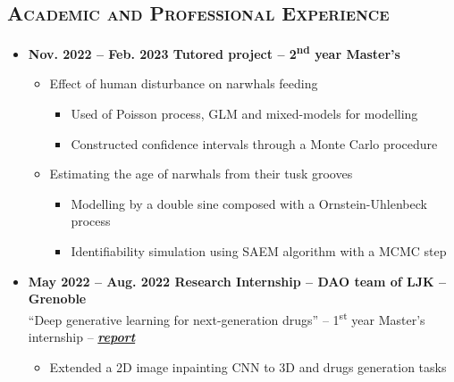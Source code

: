 \documentclass{article}
\begin{document}
\begin{minipage}{0.8\textwidth}
\begin{flushleft}
    \section*{\textsc{Academic and Professional Experience}}
    \begin{itemize}
        \item \textbf{Nov. 2022 – Feb. 2023 \qquad Tutored project – 2\textsuperscript{nd} year Master’s}
        \vspace{-.15cm}
        \begin{itemize}[leftmargin=*]
        \setlength\itemsep{.01cm}
            \item Effect of human disturbance on narwhals feeding
            \vspace{-.15cm}
            \begin{itemize}[leftmargin=*]
            \setlength\itemsep{.01cm}
                \item Used of Poisson process, GLM and mixed-models for modelling
                \item Constructed confidence intervals through a Monte Carlo procedure
            \end{itemize}
            \item Estimating the age of narwhals from their tusk grooves
            \vspace{-.15cm}
            \begin{itemize}[leftmargin=*]
            \setlength\itemsep{.01cm}
                \item Modelling by a double sine composed with a Ornstein-Uhlenbeck process
                \item Identifiability simulation using SAEM algorithm with a MCMC step
            \end{itemize}
        \end{itemize}
        \item \textbf{May 2022 – Aug. 2022 \qquad Research Internship – DAO team of LJK – Grenoble} \\
        “Deep generative learning for next-generation drugs” – 1\textsuperscript{st} year Master’s internship – \textbf{\textit{ \hyperlink{https://vadmbertr.github.io/Deep-generative-learning-for-next-generation-drugs/Internship_report___Deep_generative_learning_for_next_generation_drugs.pdf}{report}}}
        \vspace{-.15cm}
        \begin{itemize}[leftmargin=*]
        \setlength\itemsep{.01cm}
            \item Extended a 2D image inpainting CNN to 3D and drugs generation tasks

\end{itemize}
\end{itemize}
\end{flushleft}
\end{minipage}
\end{document}
